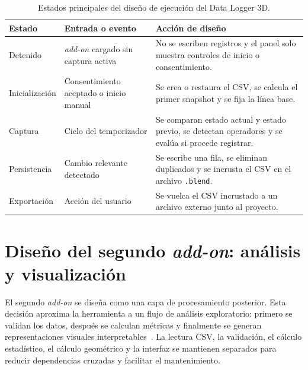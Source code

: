 \begin{table}[H]
\centering
\scriptsize
\renewcommand{\arraystretch}{1.15}
\begin{tabularx}{\textwidth}{p{3cm}p{4cm}X}
\toprule
\textbf{Estado} & \textbf{Entrada o evento} & \textbf{Acción de diseño} \\
\midrule
Detenido & \textit{add-on} cargado sin captura activa & No se escriben registros y el panel solo muestra controles de inicio o consentimiento. \\
\midrule
Inicialización & Consentimiento aceptado o inicio manual & Se crea o restaura el CSV, se calcula el primer snapshot y se fija la línea base. \\
\midrule
Captura & Ciclo del temporizador & Se comparan estado actual y estado previo, se detectan operadores y se evalúa si procede registrar. \\
\midrule
Persistencia & Cambio relevante detectado & Se escribe una fila, se eliminan duplicados y se incrusta el CSV en el archivo \texttt{.blend}. \\
\midrule
Exportación & Acción del usuario & Se vuelca el CSV incrustado a un archivo externo junto al proyecto. \\
\bottomrule
\end{tabularx}
\caption{Estados principales del diseño de ejecución del Data Logger 3D.}
\label{tab:c-estados-logger}
\end{table}

\section{Diseño del segundo \textit{add-on}: análisis y visualización}
\label{sec:c-diseno-analisis}

El segundo \textit{add-on} se diseña como una capa de procesamiento posterior. Esta decisión aproxima la herramienta a un flujo de análisis exploratorio: primero se validan los datos, después se calculan métricas y finalmente se generan representaciones visuales interpretables~\cite{fayyad1996kdd,munzner2014visualization}. La lectura CSV, la validación, el cálculo estadístico, el cálculo geométrico y la interfaz se mantienen separados para reducir dependencias cruzadas y facilitar el mantenimiento.

